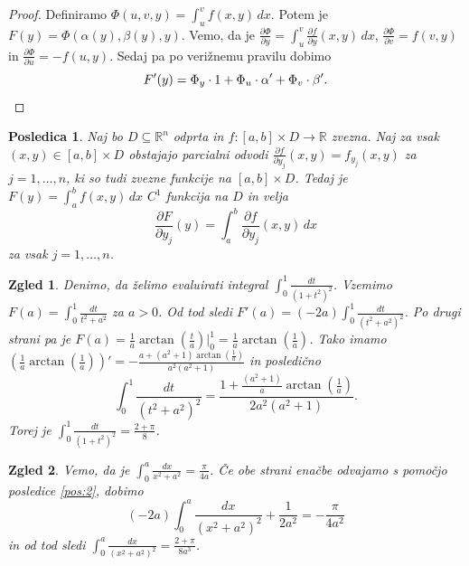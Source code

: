 \documentclass[10pt, a4paper]{article}
\newtheorem{posledica}[izr]{Posledica}
\newtheorem{zgled}{Zgled}[section]
\newenvironment{noticeC}{%
  \tcolorbox[%
  notitle,
  empty,
  enhanced,  %
  breakable,
  coltext=black, 
  fontupper=\rmfamily,
  parbox=false,
  noparskip,
  sharp corners,
  boxrule=-1pt,  %
  frame hidden,
  left=7pt,  %
  right=7pt,
  top=5pt,
  bottom=5pt,
  before skip=2.5ex plus 2pt,
  after skip=2.5ex plus 2pt,
  overlay unbroken and last={%
  },
  ]}
{\endtcolorbox}
\newenvironment{dokaz}%
  {\begin{noticeC}\begin{proof}}%
  {\end{proof}\end{noticeC}}
\newcommand{\R}{\mathbb {R}}
\begin{document}
\begin{dokaz}
    Definiramo $\Phi (u, v, y) = \int_u ^v f(x, y)\, dx$. Potem je $F(y) = \Phi (\alpha (y), \beta (y), y).$
    Vemo, da je $\frac{\partial \Phi}{\partial y} = \int_u ^v \frac{\partial f}{\partial y} (x, y)\, dx$,
    $\frac{\partial \Phi}{\partial v} = f(v, y)$ in $\frac{\partial \Phi}{\partial u} = -f(u, y)$.
    Sedaj pa po verižnemu pravilu dobimo 
    \begin{equation*}
        F'(y) = \Phi_y \cdot 1 + \Phi_u \cdot \alpha' + \Phi_v \cdot \beta'. \qedhere
    \end{equation*}
\end{dokaz}

\begin{posledica}
    Naj bo $D \subseteq \R^n$ odprta in $f: [a, b] \times D \to \R$ zvezna.
    Naj za vsak $(x, y) \in [a, b] \times D$ obstajajo parcialni odvodi $\frac{\partial f}{\partial y_j} (x, y) = f_{y_j} (x, y)$ za $j = 1, \dots, n$,
    ki so tudi zvezne funkcije na $[a, b] \times D$.
    Tedaj je $F(y) = \int_a ^b f(x, y)\, dx$ $C^1$ funkcija na $D$ in velja 
    $$\frac{\partial F}{\partial y_j} (y) = \int_a ^b \frac{\partial f}{\partial y_j} (x, y)\, dx$$
    za vsak $j = 1, \dots, n$.
\end{posledica}


\begin{zgled}
    Denimo, da želimo evaluirati integral $\int_0 ^1 \frac{dt}{(1 + t^2)^2}$.
    Vzemimo $F(a) = \int_0 ^1 \frac{dt}{t^2 + a^2}$ za $a > 0$.
    Od tod sledi $F'(a) = (-2a) \int_0 ^1 \frac{dt}{(t^2 + a^2)^2}$. Po drugi strani pa je 
    $F(a) = \frac{1}{a} \arctan \left(\frac{t}{a}\right) \Big|_0 ^1 = \frac{1}{a} \arctan \left(\frac{1}{a}\right)$.
    Tako imamo $\left(\frac{1}{a} \arctan \left(\frac{1}{a}\right)\right)' = - \frac{a + (a^2 + 1)\arctan \left(\frac{1}{a}\right)}{a^2 (a^2 + 1)}$
    in posledično
    $$\int_0 ^1 \frac{dt}{(t^2 + a^2)^2} = \frac{1 + \frac{(a^2 + 1)}{a}\arctan \left(\frac{1}{a}\right)}{2a^2 (a^2 + 1)}.$$
    Torej je $\int_0 ^1 \frac{dt}{(1 + t^2)^2} = \frac{2 + \pi}{8}$.
\end{zgled}

\begin{zgled}
    Vemo, da je $\int_0 ^a \frac{dx}{x^2 + a^2} = \frac{\pi}{4a}$. Če obe strani enačbe odvajamo s pomočjo posledice \ref{pos:2},
    dobimo 
    $$(-2a) \int_0 ^a \frac{dx}{(x^2 + a^2)^2} + \frac{1}{2a^2} = - \frac{\pi}{4a^2}$$ in od tod sledi 
    $\int_0 ^a \frac{dx}{(x^2 + a^2)^2} = \frac{2 + \pi}{8 a^3}$.
\end{zgled}
\end{document}
